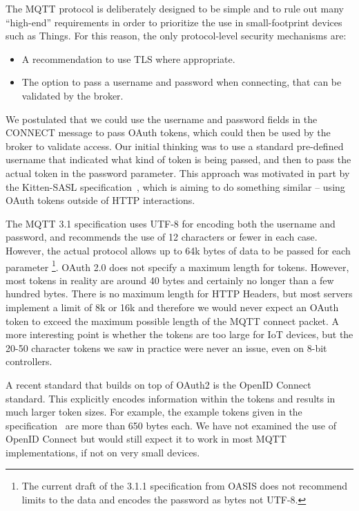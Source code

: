 \documentclass{llncs}
\begin{document}
The MQTT protocol is deliberately designed to be simple and to rule out many ``high-end'' 
requirements in order to prioritize the use in small-footprint devices such as Things. For this
reason, the only protocol-level security mechanisms are:
\begin{itemize}
\item{A recommendation to use TLS where appropriate.}
\item{The option to pass a username and password when connecting, that can be validated by the broker.}
\end{itemize}

We postulated that we could use the username and password fields in the CONNECT message 
to pass OAuth tokens, which 
could then be used by the broker to validate access. Our initial thinking was to use a 
standard pre-defined username that indicated what kind of token is being passed, and then to 
pass the actual token in the password parameter. This approach was motivated in part by the
Kitten-SASL specification~\cite{mills2011sasl}, which is aiming to do something similar -- 
using OAuth tokens outside of HTTP interactions. 

The MQTT 3.1 specification uses UTF-8 for encoding both the username and password, and recommends
the use of 12 characters or fewer in each case. However, the actual protocol allows up to 
64k bytes of data to be passed for each parameter
\footnote{The current draft of the 3.1.1 specification from OASIS does not
recommend limits to the data and encodes the password as bytes not UTF-8.}. 
OAuth 2.0 does not specify a maximum length for tokens. However, most tokens in reality are around 40 bytes and certainly no 
longer than a few hundred bytes. There is no maximum length for HTTP Headers, but most servers implement 
a limit of 8k or 16k and therefore we would never expect an OAuth token to exceed the maximum 
possible length of the MQTT connect packet. A more interesting point is whether the tokens are too 
large for IoT devices, but the 20-50 character tokens we saw in practice were never an issue,
even on 8-bit controllers. 

A recent standard that builds on top of OAuth2 is the OpenID Connect standard. This explicitly encodes 
information within the tokens and results in much larger token sizes. For example, the example tokens given in the
specification~\cite{openid-connect-core} are more than 650 bytes each. We have not examined the use of OpenID Connect
but would still expect it to work in most MQTT implementations, if not on very small devices.
\end{document}
